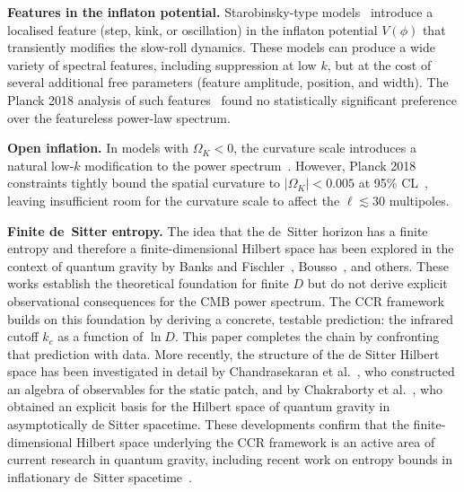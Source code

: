 \textbf{Features in the inflaton potential.}  Starobinsky-type
models~\cite{Starobinsky:1992} introduce a localised feature (step,
kink, or oscillation) in the inflaton potential $V(\phi)$ that
transiently modifies the slow-roll dynamics.  These models can produce
a wide variety of spectral features, including suppression at low $k$,
but at the cost of several additional free parameters (feature
amplitude, position, and width).  The Planck 2018 analysis of such
features~\cite{Planck:2018inflation} found no statistically significant
preference over the featureless power-law spectrum.

\textbf{Open inflation.}  In models with $\Omega_K < 0$, the
curvature scale introduces a natural low-$k$ modification to the
power spectrum~\cite{Ratra:1995}.  However, Planck 2018 constraints
tightly bound the spatial curvature to $|\Omega_K| < 0.005$ at 95\%
CL~\cite{Planck:2018params}, leaving insufficient room for the
curvature scale to affect the $\ell \lesssim 30$ multipoles.

\textbf{Finite de~Sitter entropy.}  The idea that the de~Sitter
horizon has a finite entropy and therefore a finite-dimensional Hilbert
space has been explored in the context of quantum gravity by Banks and
Fischler~\cite{Banks:2000,Banks:2001}, Bousso~\cite{Bousso:2000}, and
others.  These works establish the theoretical foundation for finite
$D$ but do not derive explicit observational consequences for the CMB
power spectrum.  The CCR framework~\cite{Chronis:2026} builds on this
foundation by deriving a concrete, testable prediction: the infrared
cutoff $k_c$ as a function of $\ln D$.  This paper completes the chain
by confronting that prediction with data. More recently, the structure 
of the de Sitter Hilbert space
has been investigated in detail by Chandrasekaran et
al.~\cite{Chandrasekaran:2023}, who constructed an algebra
of observables for the static patch, and by Chakraborty et
al.~\cite{Chakraborty:2024}, who obtained an explicit basis
for the Hilbert space of quantum gravity in asymptotically
de Sitter spacetime. These developments confirm that the
finite-dimensional Hilbert space underlying the CCR framework
is an active area of current research in quantum gravity, including
recent work on entropy bounds in inflationary de~Sitter
spacetime~\cite{Tajima:2024}.

